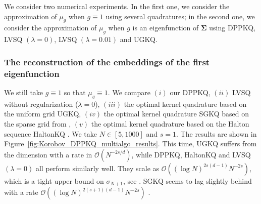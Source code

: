 \documentclass[twoside,11pt]{book}
\numberwithin{theorem}{chapter}
\numberwithin{definition}{chapter}
\numberwithin{proposition}{chapter}
\numberwithin{corollary}{chapter}
\numberwithin{example}{chapter}
\numberwithin{lemma}{chapter}
\numberwithin{assumption}{chapter}
\begin{document}
We consider two numerical experiments. In the first one, we consider the approximation of $\mu_{g}$ when $g \equiv 1$ using several quadratures; in the second one, we consider the approximation of $\mu_{g}$ when $g$ is an eigenfunction of $\bm{\Sigma}$ using DPPKQ, LVSQ $(\lambda = 0)$, LVSQ $(\lambda = 0.01)$ and UGKQ. 



\subsubsection{The reconstruction of the embeddings of the first eigenfunction}
We still take $g\equiv 1$ so that $\mu_{g} \equiv 1$. We compare $(i)$ our DPPKQ, $(ii)$ LVSQ without regularization ($\lambda =0$), $(iii)$ the optimal kernel quadrature based on the uniform grid UGKQ, $(iv)$ the optimal kernel quadrature SGKQ based on the sparse grid from \citep{Smo63}, $(v)$ the optimal kernel quadrature based on the Halton sequence HaltonKQ \citep{Hal64}. We take $N \in [5,1000]$ and $s =1$. The results are shown in Figure~\ref{fig:Korobov_DPPKQ_multialgo_results}. This time, UGKQ suffers from the dimension with a rate in $\mathcal{O}(N^{-2s/d})$, while DPPKQ, HaltonKQ and LVSQ $(\lambda = 0)$ all perform similarly well. They scale as $\mathcal{O}((\log N)^{2s(d-1)} N^{-2s})$, which is a tight upper bound on $\sigma_{N+1}$, see \citep{Bac17}.
 SGKQ seems to lag slightly behind with a rate $\mathcal{O}((\log N)^{2(s+1)(d-1)} N^{-2s})$ 
 \citep{Hol08,Smo63}.
\end{document}
